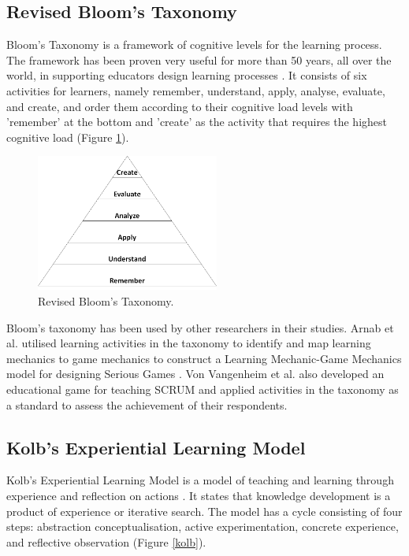 \documentclass[12pt, a4paper]{report}
\begin{document}
\subsection{Revised Bloom's Taxonomy}
Bloom's Taxonomy \cite{krathwohl2002revision} is a framework of cognitive levels for the learning process. The framework has been proven very useful for more than 50 years, all over the world, in supporting educators design learning processes \cite{munzenmaier2013bloom}. It consists of six activities for learners, namely remember, understand, apply, analyse, evaluate, and create, and order them according to their cognitive load levels with 'remember' at the bottom and 'create' as the activity that requires the highest cognitive load (Figure \ref{bloom}). 

\begin{figure}[ht]
\centering
\includegraphics[width=6cm]{bloom}
\caption{Revised Bloom's Taxonomy\cite{krathwohl2002revision}.}
\label{bloom}
\end{figure}

Bloom's taxonomy has been used by other researchers in their studies. Arnab et al. utilised learning activities in the taxonomy to identify and map learning mechanics to game mechanics to construct a Learning Mechanic-Game Mechanics model for designing Serious Games \cite{arnab2015mapping}. Von Vangenheim et al. \cite{von2013scrumia} also developed an educational game for teaching SCRUM and applied activities in the taxonomy as a standard to assess the achievement of their respondents. 

\subsection{Kolb's Experiential Learning Model}
Kolb's Experiential Learning Model is a model of teaching and learning through experience and reflection on actions \cite{kolb2014experiential}. It states that knowledge development is a product of experience or iterative search. The model has a cycle consisting of four steps: abstraction conceptualisation, active experimentation, concrete experience, and reflective observation (Figure \ref{kolb}). 
\end{document}
